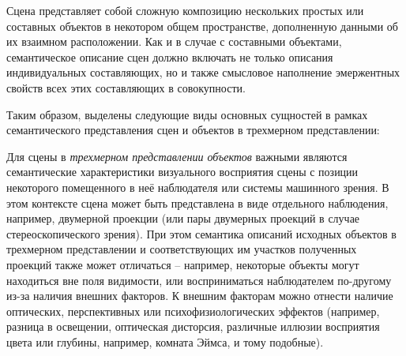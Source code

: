 Сцена представляет собой сложную композицию нескольких простых или составных объектов в некотором общем пространстве, дополненную данными об их взаимном расположении. Как и в случае с составными объектами, семантическое описание сцен должно включать не только описания индивидуальных составляющих, но и также смысловое наполнение эмержентных свойств всех этих составляющих в совокупности.

Таким образом, выделены следующие виды основных сущностей в рамках семантического представления сцен и объектов в трехмерном представлении:

\begin{SCn}
\end{SCn}
\begin{SCn}
\end{SCn}
\begin{SCn}
\end{SCn}
\begin{SCn}
\end{SCn}

Для сцены в \textit{трехмерном представлении объектов} важными являются семантические характеристики визуального восприятия сцены с позиции некоторого помещенного в неё наблюдателя или системы машинного зрения. В этом контексте сцена может быть представлена в виде отдельного наблюдения, например, двумерной проекции (или пары двумерных проекций в случае стереоскопического зрения). При этом семантика описаний исходных объектов в трехмерном представлении и соответствующих им участков полученных проекций также может отличаться -- например, некоторые объекты могут находиться вне поля видимости, или восприниматься наблюдателем по-другому из-за наличия внешних факторов. К внешним факторам можно отнести наличие оптических, перспективных или психофизиологических эффектов (например, разница в освещении, оптическая дисторсия, различные иллюзии восприятия цвета или глубины, например, комната Эймса, и тому подобные). 

